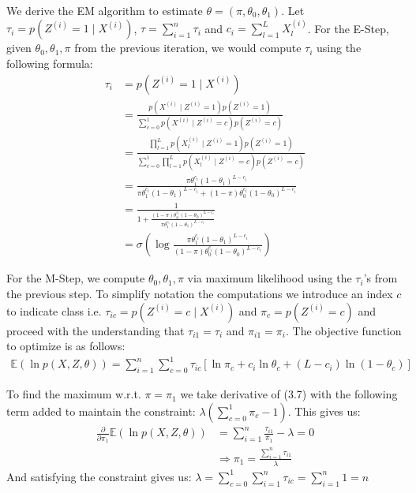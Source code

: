 \documentclass[paper=a4, fontsize=11pt]{scrartcl} %
\numberwithin{equation}{section} %
\numberwithin{figure}{section} %
\numberwithin{table}{section} %
\begin{document}
We derive the EM algorithm to estimate $\theta=(\pi, \theta_0, \theta_1)$. 
Let $\tau_i=p(Z^{(i)}=1\mid X^{(i)})$, $\tau=\sum_{i=1}^n \tau_i$ and $c_i = \sum_{l=1}^L X_{l}^{(i)}$. For the E-Step, given $\theta_0, \theta_1, \pi$ from the previous iteration, we would compute $\tau_i$ using the following formula:
\begin{align}
\tau_i &= p(Z^{(i)}=1\mid X^{(i)})\\
&=\frac{p(X^{(i)} \mid Z^{(i)}=1)p(Z^{(i)}=1)}{\sum_{c=0}^1 p(X^{(i)} \mid Z^{(i)}=c)p(Z^{(i)}=c)}\\
&= \frac{\prod_{l=1}^L p(X^{(i)}_l \mid Z^{(i)}=1)p(Z^{(i)}=1)}{\sum_{c=0}^1 \prod_{l=1}^L p(X^{(i)}_l \mid Z^{(i)}=c)p(Z^{(i)}=c)}\\
&=\frac{\pi\theta_1^{c_i}(1-\theta_1)^{L-c_i}}{\pi\theta_1^{c_i}(1-\theta_1)^{L-c_i} + (1-\pi)\theta_0^{c_i}(1-\theta_0)^{L-c_i}}\\
&=\frac{1}{1 +  \frac{(1-\pi)\theta_0^{c_i}(1-\theta_0)^{L-c_i}}{ \pi\theta_1^{c_i}(1-\theta_1)^{L-c_i}}}\\
&= \sigma\left(\log \frac{\pi\theta_1^{c_i}(1-\theta_1)^{L-c_i}}{(1-\pi)\theta_0^{c_i}(1-\theta_0)^{L-c_i}}\right)
\end{align}

For the M-Step, we compute $\theta_0, \theta_1, \pi$ via maximum likelihood using the $\tau_i$'s from the previous step. To simplify notation the computations we introduce an index $c$ to indicate class i.e. $\tau_{ic}=p(Z^{(i)}=c\mid X^{(i)})$ and $\pi_{c}=p(Z^{(i)}=c)$ and proceed with the understanding that $\tau_{i1}=\tau_i$ and $\pi_{i1} = \pi_i$. The objective function to optimize is as follows:
\begin{align}
\mathbb{E}\left( \ln p(X,Z,\theta) \right)=\sum_{i=1}^n \sum_{c=0}^1 \tau_{ic} [\ln \pi_c + c_i \ln \theta_c + (L-c_i)\ln(1-\theta_c)]
\end{align}

To find the maximum w.r.t. \(\pi = \pi_1\) we take derivative of (3.7) with the following term added to maintain the constraint: $\lambda (\sum_{c=0}^1 \pi_c - 1)$. This gives us:
\begin{align}
\frac{\partial}{\partial \pi_1}\mathbb{E}\left( \ln p(X,Z,\theta) \right)&=\sum_{i=1}^n \frac{\tau_{i1}}{\pi_1} - \lambda = 0\\
&\Rightarrow \pi_1 = \frac{\sum_{i=1}^n \tau_{i1}}{\lambda}
\end{align}
And satisfying the constraint gives us: $\lambda = \sum_{c=0}^1 \sum_{i=1}^n \tau_{ic} = \sum_{i=1}^n 1 = n$
\end{document}
